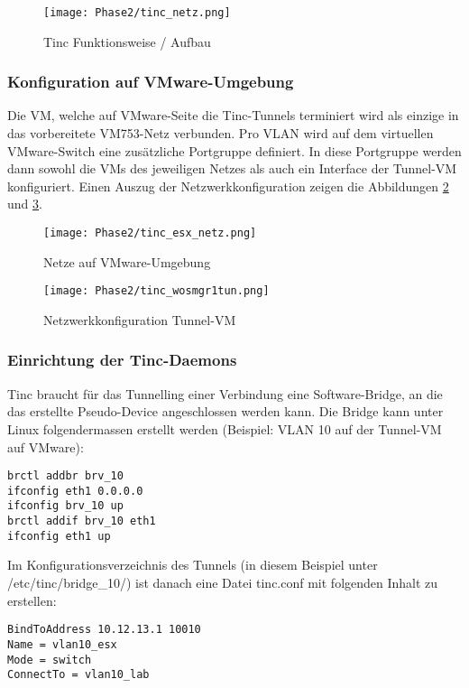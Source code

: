 \begin{figure}[H]
\centering
\texttt{[image: Phase2/tinc\_netz.png]}
\caption{Tinc Funktionsweise / Aufbau}
\label{fig:tinc}
\end{figure}

\subsubsection{Konfiguration auf VMware-Umgebung}
Die VM, welche auf VMware-Seite die Tinc-Tunnels terminiert wird als einzige in das vorbereitete VM753-Netz verbunden. Pro VLAN wird auf dem virtuellen VMware-Switch eine zusätzliche Portgruppe definiert. In diese Portgruppe werden dann sowohl die VMs des jeweiligen Netzes als auch ein Interface der Tunnel-VM konfiguriert. Einen Auszug der Netzwerkkonfiguration zeigen die Abbildungen \ref{fig:tinc-esx-overview} und \ref{fig:tinc-esx-tunvm}.

\begin{figure}[H]
\centering
\texttt{[image: Phase2/tinc\_esx\_netz.png]}
\caption{Netze auf VMware-Umgebung}
\label{fig:tinc-esx-overview}
\end{figure}

\begin{figure}[H]
\centering
\texttt{[image: Phase2/tinc\_wosmgr1tun.png]}
\caption{Netzwerkkonfiguration Tunnel-VM}
\label{fig:tinc-esx-tunvm}
\end{figure}

\subsubsection{Einrichtung der Tinc-Daemons}
Tinc braucht für das Tunnelling einer Verbindung eine Software-Bridge, an die das erstellte Pseudo-Device angeschlossen werden kann. Die Bridge kann unter Linux folgendermassen erstellt werden (Beispiel: VLAN 10 auf der Tunnel-VM auf VMware):

\begin{lstlisting}
brctl addbr brv_10
ifconfig eth1 0.0.0.0
ifconfig brv_10 up
brctl addif brv_10 eth1
ifconfig eth1 up
\end{lstlisting}

Im Konfigurationsverzeichnis des Tunnels (in diesem Beispiel unter /etc/tinc/bridge\_10/) ist danach eine Datei tinc.conf mit folgenden Inhalt zu erstellen:

\begin{lstlisting}
BindToAddress 10.12.13.1 10010
Name = vlan10_esx
Mode = switch
ConnectTo = vlan10_lab
\end{lstlisting}

